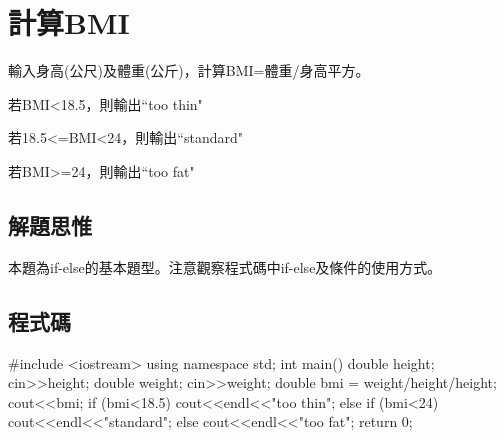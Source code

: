 \section{計算BMI}

輸入身高(公尺)及體重(公斤)，計算BMI=體重/身高平方。

若BMI<18.5，則輸出``too thin"

若18.5<=BMI<24，則輸出``standard"

若BMI>=24，則輸出``too fat"

\subsection{解題思惟}
本題為if-else的基本題型。注意觀察程式碼中if-else及條件的使用方式。

\subsection{程式碼}
\begin{cppcode}
#include <iostream>
using namespace std;
int main()
{
	double height; cin>>height;
	double weight; cin>>weight;
	double bmi = weight/height/height;
	cout<<bmi;
	if (bmi<18.5) cout<<endl<<"too thin";
	else if (bmi<24) cout<<endl<<"standard";
	else cout<<endl<<"too fat";
	return 0;
}
\end{cppcode}
